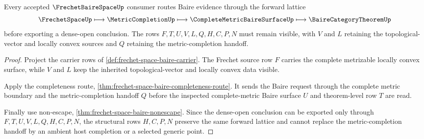 \begin{theorem}
\label{thm:frechet-baire-space-metric-completion-forward-lattice}
Every accepted $\FrechetBaireSpaceUp$ consumer routes Baire evidence through the forward lattice
$$
\FrechetSpaceUp \longmapsto \MetricCompletionUp \longmapsto \CompleteMetricBaireSurfaceUp \longmapsto \BaireCategoryTheoremUp
$$
before exporting a dense-open conclusion. The rows $F,T,U,V,L,Q,H,C,P,N$ must remain visible, with $V$ and $L$ retaining the topological-vector and locally convex sources and $Q$ retaining the metric-completion handoff.
\end{theorem}
\begin{proof}
Project the carrier rows of \autoref{def:frechet-space-baire-carrier}. The Frechet source row $F$ carries the complete metrizable locally convex surface, while $V$ and $L$ keep the inherited topological-vector and locally convex data visible.

Apply the completeness route, \autoref{thm:frechet-space-baire-completeness-route}. It sends the Baire request through the complete metric boundary and the metric-completion handoff $Q$ before the inspected complete-metric Baire surface $U$ and theorem-level row $T$ are read.

Finally use non-escape, \autoref{thm:frechet-space-baire-nonescape}. Since the dense-open conclusion can be exported only through $F,T,U,V,L,Q,H,C,P,N$, the structural rows $H,C,P,N$ preserve the same forward lattice and cannot replace the metric-completion handoff by an ambient host completion or a selected generic point.
\end{proof}




